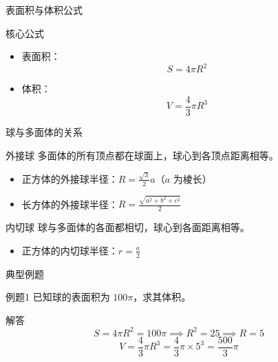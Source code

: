   
  
  
  \begin{frame}{表面积与体积公式}
    \begin{block}{核心公式}
        \begin{itemize}
            \item 表面积：\[ S = 4\pi R^2 \]
            \item 体积：\[ V = \frac{4}{3}\pi R^3 \]
        \end{itemize}
    \end{block}
  \end{frame}
  
  
  \begin{frame}{球与多面体的关系}
    \begin{block}{外接球}
        多面体的所有顶点都在球面上，球心到各顶点距离相等。
        \begin{itemize}
            \item 正方体的外接球半径：\( R = \frac{\sqrt{3}}{2}a \)（\(a\) 为棱长）
            \item 长方体的外接球半径：\( R = \frac{\sqrt{a^2 + b^2 + c^2}}{2} \)
        \end{itemize}
    \end{block}
    
    \begin{block}{内切球}
        球与多面体的各面都相切，球心到各面距离相等。
        \begin{itemize}
            \item 正方体的内切球半径：\( r = \frac{a}{2} \)
        \end{itemize}
    \end{block}
  \end{frame}
  
  
  \begin{frame}{典型例题}
    \begin{exampleblock}{例题1}
        已知球的表面积为 \(100\pi\)，求其体积。
    \end{exampleblock}
    
    \pause
    
    \begin{alertblock}{解答}
        \[
        S = 4\pi R^2 = 100\pi \implies R^2 = 25 \implies R = 5
        \]
        \[
        V = \frac{4}{3}\pi R^3 = \frac{4}{3}\pi \times 5^3 = \frac{500}{3}\pi
        \]
    \end{alertblock}
  \end{frame}
  
